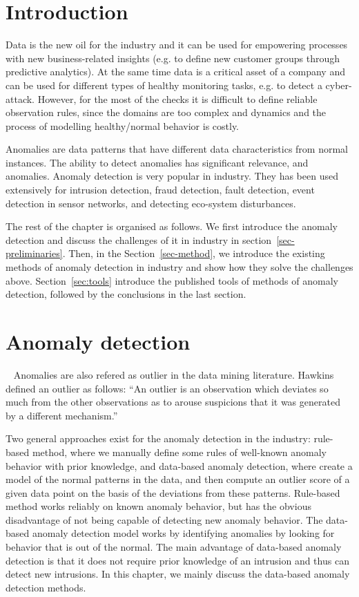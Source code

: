 \section{Introduction}\label{sec-intro}

Data is the new oil for the industry and
it can be used for empowering processes with
new business-related insights
(e.g. to define new customer groups through predictive analytics).
At the same time data is a critical asset of a company and
can be used for different types of healthy monitoring tasks,
e.g.
to detect a cyber-attack.
However,
for the most of the checks it is difficult
to define reliable observation rules,
since the domains are too complex and dynamics and
the process of modelling healthy/normal behavior is costly.

Anomalies are data patterns that
have different data characteristics from normal
instances.
The ability to detect anomalies has significant relevance,
and anomalies.
Anomaly detection is very popular in industry.
They has been used extensively for
intrusion detection,
fraud detection,
fault detection,
event detection in sensor networks,
and detecting eco-system disturbances.

The rest of the chapter is organised as follows.
We first introduce the anomaly detection and
discuss the challenges of it in industry in section~\ref{sec-preliminaries}.
Then,
in the Section~\ref{sec-method},
we introduce the existing methods of anomaly detection in
industry and show how they solve the challenges above.
Section~\ref{sec:tools} introduce the published tools of
methods of anomaly detection,
followed by the conclusions in the last section.

\section{Anomaly detection}~\label{sec-preliminaries}
Anomalies are also refered as outlier in the data mining literature.
Hawkins~\cite{hawkins1980identification} defined
an outlier as follows:
``An outlier is an observation which deviates so much from the other observations
as to arouse suspicions that it was generated by a different mechanism.''


Two general approaches exist for the anomaly detection in the industry: 
rule-based method, 
where we manually define some rules of  well-known anomaly behavior
with prior knowledge, 
and data-based anomaly detection, 
where create a model of the normal patterns in the data,
and then compute an outlier score of a given data point 
on the basis of the deviations
from these patterns. 
Rule-based method works reliably on known anomaly behavior, 
but has the obvious disadvantage of not being capable of detecting new anomaly behavior. 
The data-based anomaly detection model works by identifying anomalies by 
looking for behavior that is out of the normal. 
The main advantage of data-based anomaly detection is that
it does not require prior knowledge of an intrusion and
thus can detect new intrusions.
In this chapter,
we mainly discuss the data-based anomaly detection methods.


